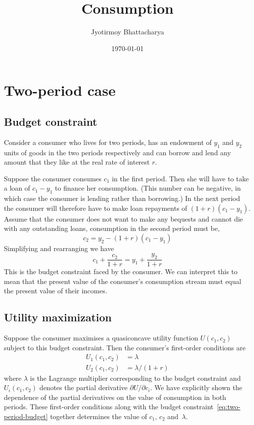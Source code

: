 \documentclass[12pt,reqno]{amsart}
\title{Consumption}
\author{Jyotirmoy Bhattacharya}
\date{\today}
\begin{document}
\maketitle
\section{Two-period case}
\subsection{Budget constraint}
Consider a consumer who lives for two periods, has an endowment of
$y_1$ and $y_2$ units of goods in the two periods respectively and can
borrow and lend any amount that they like at the real rate of interest
$r$. 

Suppose the consumer consumes $c_1$ in the
first period. Then she will have to take a loan of $c_1-y_1$ to
finance her consumption. (This number can be negative, in which case
the consumer is lending rather than borrowing.) In the next period the
consumer will therefore have to make loan repayments of
$(1+r)(c_1-y_1)$. Assume that the consumer does not want to make any
bequests and cannot die with any outstanding loans, consumption in the
second period must be,
\[c_2=y_2-(1+r)(c_1-y_1)\]
Simplifying and rearranging we have
\begin{equation}\label{eq:two-period-budget}
c_1+\frac{c_2}{1+r}=y_1+\frac{y_2}{1+r}
\end{equation}
This is the budget constraint faced by the consumer. We can interpret
this to mean that the present value of the consumer's consumption
stream must equal the present value of their incomes.

\subsection{Utility maximization}
Suppose the consumer maximises a quasiconcave utility function
$U(c_1,c_2)$ subject to this budget constraint. Then the consumer's
first-order conditions are
\begin{align}
U_1(c_1,c_2)&=\lambda\\
U_2(c_1,c_2)&=\lambda/(1+r)
\end{align}
where $\lambda$ is the Lagrange multiplier corresponding to the budget
constraint and $U_i(c_1,c_2)$ denotes the partial derivative $\partial
U/\partial c_i$. We have explicitly shown the dependence of the
partial derivatives on the value of consumption in both periods. These
first-order conditions along with the budget
constraint~\eqref{eq:two-period-budget} together determines the value
of $c_1$, $c_2$ and~$\lambda$.
\end{document}
